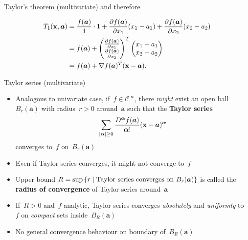 \documentclass[11pt,compress,t,notes=noshow, xcolor=table]{beamer}
\begin{document}
\begin{vbframe}{Taylor's theorem (multivariate)}
and therefore

\vspace{-\baselineskip}

\begin{align*}
    T_1(\mathbf{x},\bm{a}) &= \frac{f(\bm{a})}{1} \cdot 1 + \frac{\partial f(\bm{a})}{\partial x_1} (x_1 - a_1) + \frac{\partial f(\bm{a})}{\partial x_2} (x_2 - a_2) \\
    &= f(\bm{a}) + \begin{pmatrix}\frac{\partial f(\bm{a})}{\partial x_1} \\ \frac{\partial f(\bm{a})}{\partial x_2}\end{pmatrix}^T \begin{pmatrix}x_1 - a_1 \\ x_2 - a_2\end{pmatrix} \\
    &= f(\bm{a}) + \nabla f(\bm{a})^T (\mathbf{x} - \bm{a}).
\end{align*}

\end{vbframe}

\begin{vbframe}{Taylor series (multivariate)}

\begin{itemize}
    \item Analogous to univariate case, if~$f \in \mathcal{C}^\infty$, there \textit{might} exist an open ball~$B_r(\bm{a})$ with radius~$r>0$ around~$\bm{a}$ such that the \textbf{Taylor series}
        \begin{equation*}
            \sum_{|\bm{\alpha}| \geq 0} \frac{D^{\bm{\alpha}} f(\bm{a})}{{\bm{\alpha}}!} (\mathbf{x} - \bm{a})^{\bm{\alpha}}
        \end{equation*}
        converges to~$f$ on~$B_r(\bm{a})$
    \item Even if Taylor series converges, it might not converge to~$f$
    \item Upper bound $R = \sup \left\lbrace r \;|\; \textnormal{Taylor series converges on } B_r(\bm{a}) \right\rbrace$ is called the \textbf{radius of convergence} of Taylor series around~$\bm{a}$
    \item If~$R>0$ and~$f$ analytic, Taylor series converges \textit{absolutely} and \textit{uniformly} to~$f$ on \textit{compact} sets inside~$B_R(\bm{a})$
    \item No general convergence behaviour on boundary of~$B_R(\bm{a})$
\end{itemize}

\end{vbframe}

\endlecture
\end{document}
